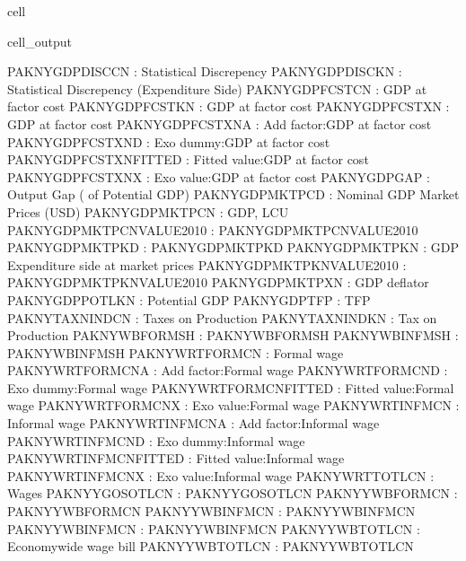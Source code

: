 \documentclass[letterpaper,10pt,english]{jupyterBook}
\begin{document}
\begin{sphinxuseclass}{cell}
\begin{sphinxVerbatimOutput}
\begin{sphinxuseclass}{cell_output}
\begin{sphinxVerbatim}[commandchars=\\\{\}]
PAKNYGDPDISCCN            : Statistical Discrepency
PAKNYGDPDISCKN            : Statistical Discrepency (Expenditure Side)
PAKNYGDPFCSTCN            : GDP at factor cost
PAKNYGDPFCSTKN            : GDP at factor cost
PAKNYGDPFCSTXN            : GDP at factor cost
PAKNYGDPFCSTXN\PYGZus{}A          : Add factor:GDP at factor cost
PAKNYGDPFCSTXN\PYGZus{}D          : Exo dummy:GDP at factor cost
PAKNYGDPFCSTXN\PYGZus{}FITTED     : Fitted  value:GDP at factor cost
PAKNYGDPFCSTXN\PYGZus{}X          : Exo value:GDP at factor cost
PAKNYGDPGAP\PYGZus{}              : Output Gap (\PYGZpc{} of Potential GDP)
PAKNYGDPMKTPCD            : Nominal GDP Market Prices (USD)
PAKNYGDPMKTPCN            : GDP, LCU
PAKNYGDPMKTPCN\PYGZus{}VALUE\PYGZus{}2010 : PAKNYGDPMKTPCN\PYGZus{}VALUE\PYGZus{}2010
PAKNYGDPMKTPKD            : PAKNYGDPMKTPKD
PAKNYGDPMKTPKN            : GDP Expenditure side at market prices
PAKNYGDPMKTPKN\PYGZus{}VALUE\PYGZus{}2010 : PAKNYGDPMKTPKN\PYGZus{}VALUE\PYGZus{}2010
PAKNYGDPMKTPXN            : GDP deflator
PAKNYGDPPOTLKN            : Potential GDP
PAKNYGDPTFP               : TFP
PAKNYTAXNINDCN            : Taxes on Production
PAKNYTAXNINDKN            : Tax on Production
PAKNYWBFORMSH             : PAKNYWBFORMSH
PAKNYWBINFMSH             : PAKNYWBINFMSH
PAKNYWRTFORMCN            : Formal wage
PAKNYWRTFORMCN\PYGZus{}A          : Add factor:Formal wage
PAKNYWRTFORMCN\PYGZus{}D          : Exo dummy:Formal wage
PAKNYWRTFORMCN\PYGZus{}FITTED     : Fitted  value:Formal wage
PAKNYWRTFORMCN\PYGZus{}X          : Exo value:Formal wage
PAKNYWRTINFMCN            : Informal wage
PAKNYWRTINFMCN\PYGZus{}A          : Add factor:Informal wage
PAKNYWRTINFMCN\PYGZus{}D          : Exo dummy:Informal wage
PAKNYWRTINFMCN\PYGZus{}FITTED     : Fitted  value:Informal wage
PAKNYWRTINFMCN\PYGZus{}X          : Exo value:Informal wage
PAKNYWRTTOTLCN            : Wages
PAKNYYGOSOTLCN            : PAKNYYGOSOTLCN
PAKNYYWBFORMCN            : PAKNYYWBFORMCN
PAKNYYWBINFMCN            : PAKNYYWBINFMCN
PAKNYYWBINFMCN\PYGZus{}           : PAKNYYWBINFMCN\PYGZus{}
PAKNYYWBTOTLCN            : Economy\PYGZhy{}wide wage bill
PAKNYYWBTOTLCN\PYGZus{}           : PAKNYYWBTOTLCN\PYGZus{}
\end{sphinxVerbatim}

\end{sphinxuseclass}\end{sphinxVerbatimOutput}

\end{sphinxuseclass}
\end{document}
